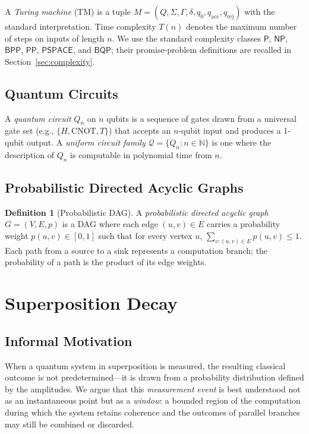 \documentclass[11pt]{article}
\theoremstyle{plain}
\theoremstyle{definition}
\newtheorem{definition}[theorem]{Definition}
\theoremstyle{remark}
\newcommand{\pspace}{\ensuremath{\mathsf{PSPACE}}}
\newcommand{\bqp}{\ensuremath{\mathsf{BQP}}}
\newcommand{\bpp}{\ensuremath{\mathsf{BPP}}}
\newcommand{\pp}{\ensuremath{\mathsf{PP}}}
\newcommand{\Pcls}{\ensuremath{\mathsf{P}}}
\newcommand{\NP}{\ensuremath{\mathsf{NP}}}
\newcommand{\QC}{\ensuremath{\mathcal{Q}}}   %
\newcommand{\Nat}{\mathbb{N}}
\begin{document}
A \emph{Turing machine} (TM) is a tuple $M = (Q, \Sigma, \Gamma, \delta,
q_0, q_{\text{acc}}, q_{\text{rej}})$ with the standard interpretation.
Time complexity $T(n)$ denotes the maximum number of steps on inputs of
length $n$.  We use the standard complexity classes $\Pcls$, $\NP$, $\bpp$,
$\pp$, $\pspace$, and $\bqp$; their promise-problem definitions are recalled
in Section~\ref{sec:complexity}.

\subsection{Quantum Circuits}

A \emph{quantum circuit} $Q_n$ on $n$ qubits is a sequence of gates drawn
from a universal gate set (e.g., $\{H, \mathrm{CNOT}, T\}$) that accepts an
$n$-qubit input and produces a 1-qubit output.  A \emph{uniform circuit
family} $\QC = \{Q_n : n \in \Nat\}$ is one where the description of $Q_n$
is computable in polynomial time from $n$.

\subsection{Probabilistic Directed Acyclic Graphs}

\begin{definition}[Probabilistic DAG]
  A \emph{probabilistic directed acyclic graph} $G = (V, E, p)$ is a DAG
  where each edge $(u, v) \in E$ carries a probability weight
  $p(u,v) \in [0,1]$ such that for every vertex $u$,
  $\sum_{v : (u,v) \in E} p(u,v) \leq 1$.  Each path from a source to a
  sink represents a computation branch; the probability of a path is the
  product of its edge weights.
\end{definition}

\section{Superposition Decay}
\label{sec:sd}

\subsection{Informal Motivation}

When a quantum system in superposition is measured, the resulting classical
outcome is not predetermined---it is drawn from a probability distribution
defined by the amplitudes.  We argue that this \emph{measurement event} is
best understood not as an instantaneous point but as a \emph{window}: a
bounded region of the computation during which the system retains coherence
and the outcomes of parallel branches may still be combined or discarded.
\end{document}
